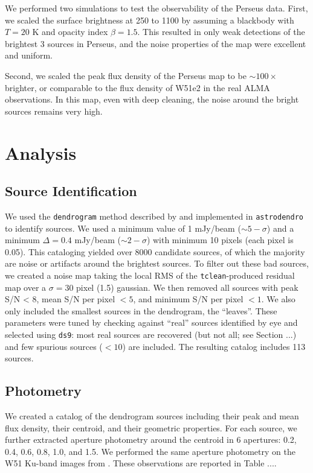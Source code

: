 We performed two simulations to test the observability of the Perseus data.
First, we scaled the surface brightness at 250 \um to 1100 \um by assuming a
blackbody with $T=20$ K and opacity index $\beta=1.5$.  This resulted in only
weak detections of the brightest 3 sources in Perseus, and the noise properties
of the map were excellent and uniform.

Second, we scaled the peak flux density of the Perseus map to be
$\sim100\times$ brighter, or comparable to the flux density of W51e2 in the
real ALMA observations.  In this map, even with deep cleaning, the noise around
the bright sources remains very high.



\section{Analysis}
\subsection{Source Identification}
We used the \texttt{dendrogram} method described by \citet{Rosolowsky2008a} and
implemented in \texttt{astrodendro} to identify sources.  We used a minimum
value of 1 mJy/beam ($\sim5-\sigma$) and a minimum $\Delta=0.4$ mJy/beam
($\sim2-\sigma$) with minimum 10 pixels (each pixel is 0.05\arcsec).  This
cataloging yielded over 8000 candidate sources, of which the majority are noise
or artifacts around the brightest sources.  To filter out these bad sources,
we created a noise map taking the local RMS of the \texttt{tclean}-produced
residual map over a $\sigma=30$ pixel (1.5\arcsec) gaussian.  We then removed
all sources with peak S/N < 8, mean S/N per pixel $< 5$, and minimum S/N per
pixel $ < 1$.  We also only included the smallest sources in the dendrogram,
the ``leaves''.  These parameters were tuned by checking against ``real''
sources identified by eye and selected using \texttt{ds9}: most real sources are
recovered (but not all; see Section ...) and few spurious sources ($<10$) are
included.  The resulting catalog includes 113 sources.

\subsection{Photometry}
We created a catalog of the dendrogram sources including their peak and mean flux density,
their centroid, and their geometric properties.  For each source, we further extracted aperture
photometry around the centroid in 6 apertures: 0.2, 0.4, 0.6, 0.8, 1.0, and 1.5\arcsec.
We performed the same aperture photometry on the W51 Ku-band images from \citet{Ginsburg2016a}.
These observations are reported in Table {...}.

